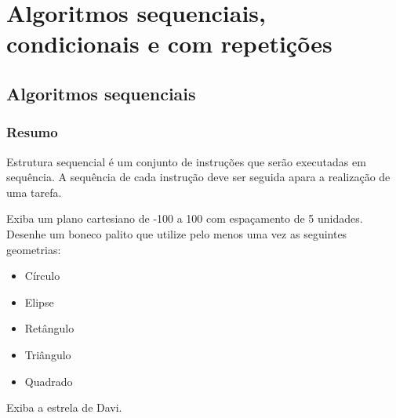 
\part[Algoritmos sequenciais, condicionais e com repetições]
{Algoritmos sequenciais, condicionais e com repetições}


\chapter[Algoritmos sequenciais]
{Algoritmos sequenciais}



\section{Resumo}

Estrutura sequencial é um conjunto de instruções que serão executadas em sequência. A sequência de cada instrução deve ser seguida apara a realização de uma tarefa.


%
%







\begin{problems}
\prob
Exiba um plano cartesiano de -100 a 100 com espaçamento de 5 unidades.
\label{ex:cap01_ex1}
\prob
Desenhe um boneco palito que utilize pelo menos uma vez as seguintes geometrias:
\begin{itemize}
\item
Círculo
\item
Elipse
\item
Retângulo
\item
Triângulo
\item
Quadrado
\end{itemize}
\label{ex:cap01_ex2}
\prob
Exiba a estrela de Davi.
\label{ex:cap01_ex3}
\end{problems}


